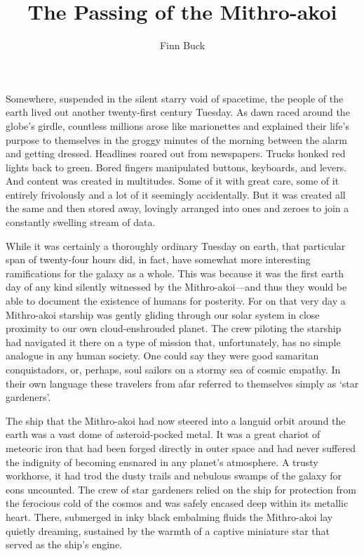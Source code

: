 \documentclass[12pt]{article}
\title{The Passing of the Mithro-akoi}
\author{Finn Buck}
\begin{document}
\maketitle


Somewhere,
suspended in the silent starry void of spacetime,
the people of the earth lived out another twenty-first century Tuesday.
As dawn raced around the globe's girdle,
countless millions arose like marionettes
and explained their life's purpose to themselves in the groggy minutes of the morning between the alarm and getting dressed.
Headlines roared out from newspapers.
Trucks honked red lights back to green.
Bored fingers manipulated buttons, keyboards, and levers.
And content was created in multitudes.
Some of it with great care,
some of it entirely frivolously
and a lot of it seemingly accidentally.
But it was created all the same and then stored away,
lovingly arranged into ones and zeroes to join a constantly swelling stream of data.

While it was certainly a thoroughly ordinary Tuesday on earth,
that particular span of twenty-four hours did, in fact, have somewhat more interesting ramifications for the galaxy as a whole.
This was because it was the first earth day of any kind silently witnessed by the Mithro-akoi---and thus they would be able to document the existence of humans for posterity.
For on that very day a Mithro-akoi starship was gently gliding through our solar system in close proximity to our own cloud-enshrouded planet.
The crew piloting the starship had navigated it there on a type of mission that, unfortunately, has no simple analogue in any human society.
One could say they were good samaritan conquistadors,
or, perhaps, soul sailors on a stormy sea of cosmic empathy.
In their own language these travelers from afar referred to themselves simply as `star gardeners'.

The ship that the Mithro-akoi had now steered into a languid orbit around the earth was a vast dome of asteroid-pocked metal.
It was a great chariot of meteoric iron that had been forged directly in outer space 
and had never suffered the indignity of becoming ensnared in any planet's atmosphere.
A trusty workhorse,
it had trod the dusty trails and nebulous swamps of the galaxy for eons uncounted.
The crew of star gardeners relied on the ship for protection from the ferocious cold of the cosmos and was safely encased deep within its metallic heart.
There,
submerged in inky black embalming fluids the Mithro-akoi lay quietly dreaming,
sustained by the warmth of a captive miniature star that served as the ship's engine.
\end{document}
